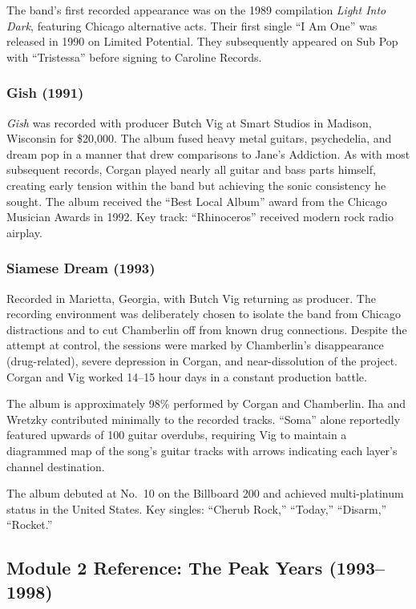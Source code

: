 \documentclass[11pt,letterpaper]{article}
\begin{document}
The band's first recorded appearance was on the 1989 compilation \textit{Light Into Dark}, featuring Chicago alternative acts. Their first single ``I Am One'' was released in 1990 on Limited Potential. They subsequently appeared on Sub Pop with ``Tristessa'' before signing to Caroline Records.

\subsubsection{Gish (1991)}

\textit{Gish} was recorded with producer Butch Vig at Smart Studios in Madison, Wisconsin for \$20,000. The album fused heavy metal guitars, psychedelia, and dream pop in a manner that drew comparisons to Jane's Addiction. As with most subsequent records, Corgan played nearly all guitar and bass parts himself, creating early tension within the band but achieving the sonic consistency he sought. The album received the ``Best Local Album'' award from the Chicago Musician Awards in 1992. Key track: ``Rhinoceros'' received modern rock radio airplay.

\subsubsection{Siamese Dream (1993)}

Recorded in Marietta, Georgia, with Butch Vig returning as producer. The recording environment was deliberately chosen to isolate the band from Chicago distractions and to cut Chamberlin off from known drug connections. Despite the attempt at control, the sessions were marked by Chamberlin's disappearance (drug-related), severe depression in Corgan, and near-dissolution of the project. Corgan and Vig worked 14--15 hour days in a constant production battle.

The album is approximately 98\% performed by Corgan and Chamberlin. Iha and Wretzky contributed minimally to the recorded tracks. ``Soma'' alone reportedly featured upwards of 100 guitar overdubs, requiring Vig to maintain a diagrammed map of the song's guitar tracks with arrows indicating each layer's channel destination.

The album debuted at No.\ 10 on the Billboard 200 and achieved multi-platinum status in the United States. Key singles: ``Cherub Rock,'' ``Today,'' ``Disarm,'' ``Rocket.''

\subsection{Module 2 Reference: The Peak Years (1993--1998)}
\end{document}
